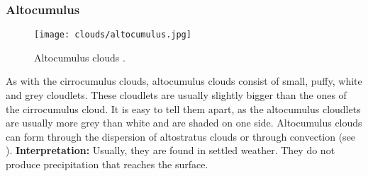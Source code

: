 \subsubsection{Altocumulus}
\begin{wrapfigure}[10]{r}{6cm}
    \vspace{-\baselineskip}
    \texttt{[image: clouds/altocumulus.jpg]}
    \caption{Altocumulus clouds \protect\cite{cloudtypes:wiki:altocumulus}.}
    \label{img:clouds:altocumulus}
\end{wrapfigure}
As with the cirrocumulus clouds, altocumulus clouds consist of small, puffy, white and grey \gls{cloudlet}s.
These \gls{cloudlet}s are usually slightly bigger than the ones of the cirrocumulus cloud.
It is easy to tell them apart, as the altocumulus \gls{cloudlet}s are usually more grey than white and are shaded on one side.
Altocumulus clouds can form through the dispersion of altostratus clouds or through \gls{convection} (see ).
\emptyline
\textbf{Interpretation:}
Usually, they are found in settled weather. They do not produce \gls{precipitation} that reaches the surface.